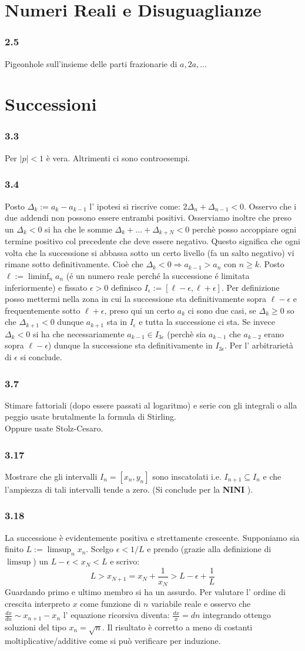 \documentclass[a4paper,11pt]{article}
\newcommand{\ex}[1]{\subsubsection*{#1}}
\newcommand{\equip}{\sim}
\newcommand{\norm}[1]{\mid{#1}\mid}
\newcommand{\NINI}{{\bf NINI }}
\newcommand{\hide}[1]{{\color{white}{#1}}}
\begin{document}
\section{Numeri Reali e Disuguaglianze}
\ex{2.5} Pigeonhole sull'insieme delle parti frazionarie di $a, 2a, \ldots$

\section{Successioni}
\ex{3.3} Per $\norm{p} < 1$ \`e vera. Altrimenti ci sono controesempi. \hide{logaritmi o cose così}
\ex{3.4} Posto $\Delta_k:=a_k -a_{k-1}$ l' ipotesi si riscrive come: $ 2\Delta_n+\Delta_{n-1}<0$. Osservo che i due addendi non possono essere entrambi positivi. Osserviamo inoltre che preso un $\Delta_k<0$ si ha che le somme $\Delta_k+\ldots+\Delta_{k+N}<0$ perchè posso accoppiare ogni termine positivo col precedente che deve essere negativo. Questo significa che ogni volta che la successione si abbassa sotto un certo livello (fa un salto negativo) vi rimane sotto definitivamente. Cioè che $\Delta_k<0 \Rightarrow a_{k-1}>a_n$ con $n\ge k$. Posto $\ell:=\liminf_{n} a_n$ (\'e un numero reale perch\'e la successione \'e limitata inferiormente) e fissato $\epsilon>0$ definisco $I_{\epsilon}:=[\ell-\epsilon, \ell +\epsilon]$. Per definizione posso mettermi nella zona in cui la successione sta definitivamente sopra $\ell-\epsilon$ e frequentemente sotto $\ell +\epsilon$, preso qui un certo $a_k$ ci sono due casi, se $\Delta_k\ge0$ so che $\Delta_{k+1}<0$ dunque $a_{k+1}$ sta in $I_{\epsilon}$ e tutta la successione ci sta. Se invece $\Delta_{k}<0$ si ha che necessariamente $a_{k-1}\in I_{3\epsilon}$ (perchè sia $a_{k-1}$ che $a_{k-2}$ erano sopra $\ell-\epsilon$) dunque la successione sta definitivamente in $I_{3\epsilon}$. Per l' arbitrarietà di $\epsilon$ si conclude.
\ex{3.7} Stimare fattoriali (dopo essere passati al logaritmo) e serie con gli integrali o alla peggio usate brutalmente la formula di Stirling. \\ Oppure \hide{, se siete persone malvagie,} usate Stolz-Cesaro.
\ex{3.17} Mostrare che gli intervalli $I_n = [x_n, y_n]$ sono inscatolati i.e. $I_{n+1} \subseteq I_{n}$ e che l'ampiezza di tali intervalli tende a zero. (Si conclude per la \NINI).
\ex{3.18} La successione è evidentemente positiva e strettamente crescente. Supponiamo sia finito $L:=\limsup_n x_n$. Scelgo $\epsilon<1/L$ e prendo (grazie alla definizione di $\limsup$) un $L-\epsilon<x_N<L$ e scrivo:
$$ L>x_{N+1}=x_N+\frac{1}{x_N}>L-\epsilon+\frac{1}{L}$$
Guardando primo e ultimo membro si ha un assurdo. Per valutare l' ordine di crescita interpreto $x$ come funzione di $n$ variabile reale e osservo che $\frac{dx}{dn}\equip x_{n+1}-x_n$ l' equazione ricorsiva diventa: $\frac{dx}{x}=dn$ integrando ottengo soluzioni del tipo $x_n=\sqrt{n}$. Il risultato è corretto a meno di costanti moltiplicative/additive come si può verificare per induzione.
\end{document}
